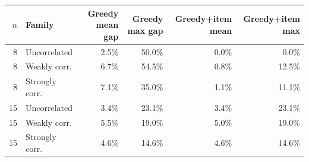 \begin{tabular}{@{}r l r r r r@{}}
\toprule
$n$ & Family & Greedy mean gap & Greedy max gap & Greedy+item mean & Greedy+item max\\
\midrule
8 & Uncorrelated & 2.5\% & 50.0\% & 0.0\% & 0.0\%\\
8 & Weakly corr. & 6.7\% & 54.5\% & 0.8\% & 12.5\%\\
8 & Strongly corr. & 7.1\% & 35.0\% & 1.1\% & 11.1\%\\
\midrule
15 & Uncorrelated & 3.4\% & 23.1\% & 3.4\% & 23.1\%\\
15 & Weakly corr. & 5.5\% & 19.0\% & 5.0\% & 19.0\%\\
15 & Strongly corr. & 4.6\% & 14.6\% & 4.6\% & 14.6\%\\
\bottomrule
\end{tabular}

